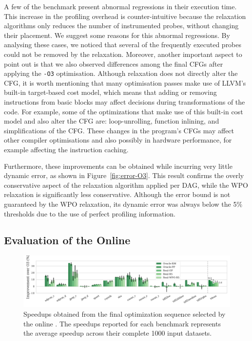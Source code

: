 A few of the benchmark present abnormal regressions in their execution time.
This increase in the profiling overhead is counter-intuitive because the
relaxation algorithms only reduces the number of instrumented probes,
without changing their placement.
We suggest some reasons for this abnormal regressions.
By analysing these cases, we noticed that several of the frequently executed
probes could not be removed by the relaxation.
Moreover, another important aspect to point out is that we also observed
differences among the final CFGs after applying the \texttt{-O3} optimisation.
Although relaxation does not directly alter the CFG, it is worth mentioning that
many optimisation passes make use of LLVM's built-in target-based cost model,
which means that adding or removing instructions from basic blocks may affect
decisions during transformations of the code.
For example, some of the optimizations that make use of this built-in cost model
and also alter the CFG are: loop-unrolling, function inlining, and
simplifications of the CFG.
These changes in the program's CFGs may affect other compiler optimisations and
also possibly in hardware performance, for example affecting the instruction
caching.

Furthermore, these improvements can be obtained while incurring very little dynamic error, as shown in Figure~\ref{fig:error-O3}.
This result confirms the overly conservative aspect of the relaxation algorithm applied per DAG,
while the WPO relaxation is significantly less conservative.
Although the error bound is not guaranteed by the WPO relaxation,
its dynamic error was always below the 5\% thresholds due to the use
of perfect profiling information.

\subsection{Evaluation of the Online {\IterComp}}

\begin{figure}[t]
    \centering
    \includegraphics[width=\textwidth]{figs/speedups.pdf}
    \caption{Speedups obtained from the final optimization sequence selected by the online {\itercomp}.
	         The speedups reported for each benchmark represents the average speedup across their complete 1000 input datasets.}
    \label{fig:speedups}
\end{figure}

